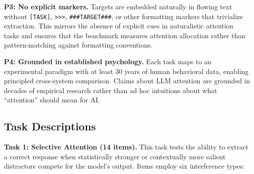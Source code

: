 \documentclass{article}
\begin{document}
\textbf{P3: No explicit markers.} Targets are embedded naturally in flowing text without \texttt{[TASK]}, \texttt{>>>}, \texttt{\#\#\#TARGET\#\#\#}, or other formatting markers that trivialize extraction. This mirrors the absence of explicit cues in naturalistic attention tasks \citep{mack1998} and ensures that the benchmark measures attention allocation rather than pattern-matching against formatting conventions.

\textbf{P4: Grounded in established psychology.} Each task maps to an experimental paradigm with at least 30 years of human behavioral data, enabling principled cross-system comparison. Claims about LLM attention are grounded in decades of empirical research rather than ad hoc intuitions about what ``attention'' should mean for AI.

\subsection{Task Descriptions}

\textbf{Task 1: Selective Attention (14 items).} This task tests the ability to extract a correct response when statistically stronger or contextually more salient distractors compete for the model's output. Items employ six interference types:
\end{document}
